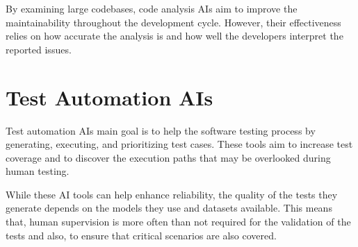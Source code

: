 By examining large codebases, code analysis AIs aim to improve the maintainability throughout the development cycle. However, their effectiveness relies on how accurate the analysis is and how well the developers interpret the reported issues.

\section{Test Automation AIs}

Test automation AIs main goal is to help the software testing process by generating, executing, and prioritizing test cases. These tools aim to increase test coverage and to discover the execution paths that may be overlooked during human testing.

While these AI tools can help enhance reliability, the quality of the tests they generate depends on the models they use and datasets available. This means that, human supervision is more often than not required for the validation of the tests and also, to ensure that critical scenarios are also covered.
